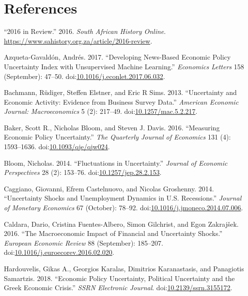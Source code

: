 \documentclass[11pt,preprint, authoryear]{elsarticle}
\numberwithin{equation}{section}
\numberwithin{figure}{section}
\numberwithin{table}{section}
\begin{document}
\newpage

\section*{References}\label{references}

\hypertarget{refs}{}
\hypertarget{ref-2016}{}
``2016 in Review.'' 2016. \emph{South African History Online}.
\url{https://www.sahistory.org.za/article/2016-review}.

\hypertarget{ref-Azqueta-Gavaldon2017}{}
Azqueta-Gavaldón, Andrés. 2017. ``Developing News-Based Economic Policy
Uncertainty Index with Unsupervised Machine Learning.'' \emph{Economics
Letters} 158 (September): 47--50.
doi:\href{https://doi.org/10.1016/j.econlet.2017.06.032}{10.1016/j.econlet.2017.06.032}.

\hypertarget{ref-Bachmann2013}{}
Bachmann, Rüdiger, Steffen Elstner, and Eric R Sims. 2013. ``Uncertainty
and Economic Activity: Evidence from Business Survey Data.''
\emph{American Economic Journal: Macroeconomics} 5 (2): 217--49.
doi:\href{https://doi.org/10.1257/mac.5.2.217}{10.1257/mac.5.2.217}.

\hypertarget{ref-Baker2016}{}
Baker, Scott R., Nicholas Bloom, and Steven J. Davis. 2016. ``Measuring
Economic Policy Uncertainty.'' \emph{The Quarterly Journal of Economics}
131 (4): 1593--1636.
doi:\href{https://doi.org/10.1093/qje/qjw024}{10.1093/qje/qjw024}.

\hypertarget{ref-Bloom2014}{}
Bloom, Nicholas. 2014. ``Fluctuations in Uncertainty.'' \emph{Journal of
Economic Perspectives} 28 (2): 153--76.
doi:\href{https://doi.org/10.1257/jep.28.2.153}{10.1257/jep.28.2.153}.

\hypertarget{ref-Caggiano2014}{}
Caggiano, Giovanni, Efrem Castelnuovo, and Nicolas Groshenny. 2014.
``Uncertainty Shocks and Unemployment Dynamics in U.S. Recessions.''
\emph{Journal of Monetary Economics} 67 (October): 78--92.
doi:\href{https://doi.org/10.1016/j.jmoneco.2014.07.006}{10.1016/j.jmoneco.2014.07.006}.

\hypertarget{ref-Caldara2016}{}
Caldara, Dario, Cristina Fuentes-Albero, Simon Gilchrist, and Egon
Zakrajšek. 2016. ``The Macroeconomic Impact of Financial and Uncertainty
Shocks.'' \emph{European Economic Review} 88 (September): 185--207.
doi:\href{https://doi.org/10.1016/j.euroecorev.2016.02.020}{10.1016/j.euroecorev.2016.02.020}.

\hypertarget{ref-Hardouvelis2018}{}
Hardouvelis, Gikas A., Georgios Karalas, Dimitrios Karanastasis, and
Panagiotis Samartzis. 2018. ``Economic Policy Uncertainty, Political
Uncertainty and the Greek Economic Crisis.'' \emph{SSRN Electronic
Journal}.
doi:\href{https://doi.org/10.2139/ssrn.3155172}{10.2139/ssrn.3155172}.
\end{document}
